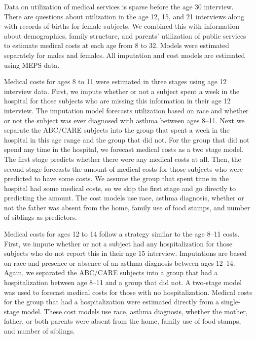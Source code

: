 \noindent Data on utilization of medical services is sparse before the age 30 interview. There are questions about utilization in the age 12, 15, and 21 interviews along with records of births for female subjects. We combined this with information about demographics, family structure, and parents' utilization of public services to estimate medical costs at each age from 8 to 32. Models were estimated separately for males and females. All imputation and cost models are estimated using MEPS data.

\noindent Medical costs for ages 8 to 11 were estimated in three stages using age 12 interview data. First, we impute whether or not a subject spent a week in the hospital for those subjects who are missing this information in their age 12 interview. The imputation model forecasts utilization based on race and whether or not the subject was ever diagnosed with asthma between ages 8--11. Next we separate the ABC/CARE subjects into the group that spent a week in the hospital in this age range and the group that did not. For the group that did not spend any time in the hospital, we forecast medical costs as a two stage model. The first stage predicts whether there were any medical costs at all. Then, the second stage forecasts the amount of medical costs for those subjects who were predicted to have some costs. We assume the group that spent time in the hospital had some medical costs, so we skip the first stage and go directly to predicting the amount. The cost models use race, asthma diagnosis, whether or not the father was absent from the home, family use of food stamps, and number of siblings as predictors.

\noindent Medical costs for ages 12 to 14 follow a strategy similar to the age 8--11 costs. First, we impute whether or not a subject had any hospitalization for those subjects who do not report this in their age 15 interview. Imputations are based on race and presence or absence of an asthma diagnosis between ages 12--14. Again, we separated the ABC/CARE subjects into a group that had a hospitalization between age 8--11 and a group that did not. A two-stage model was used to forecast medical costs for those with no hospitalization. Medical costs for the group that had a hospitalization were estimated directly from a single-stage model. These cost models use race, asthma diagnosis, whether the mother, father, or both parents were absent from the home, family use of food stamps, and number of siblings.

